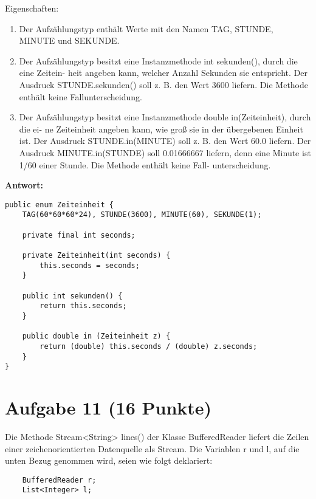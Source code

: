 Eigenschaften:

\begin{enumerate}
    \item Der Aufzählungstyp enthält Werte mit den Namen TAG, STUNDE, MINUTE und SEKUNDE.
    \item Der Aufzählungstyp besitzt eine Instanzmethode int sekunden(), durch die eine
          Zeitein- heit angeben kann, welcher Anzahl Sekunden sie entspricht. Der
          Ausdruck STUNDE.sekunden() soll z. B. den Wert 3600 liefern. Die Methode
          enthält keine Fallunterscheidung.
    \item Der Aufzählungstyp besitzt eine Instanzmethode double in(Zeiteinheit), durch
          die ei- ne Zeiteinheit angeben kann, wie groß sie in der übergebenen Einheit
          ist. Der Ausdruck STUNDE.in(MINUTE) soll z. B. den Wert 60.0 liefern. Der
          Ausdruck MINUTE.in(STUNDE) soll 0.01666667 liefern, denn eine Minute ist 1/60
          einer Stunde. Die Methode enthält keine Fall- unterscheidung.
\end{enumerate}

\textbf{Antwort:}

\begin{lstlisting}
public enum Zeiteinheit {
    TAG(60*60*60*24), STUNDE(3600), MINUTE(60), SEKUNDE(1);

    private final int seconds;
    
    private Zeiteinheit(int seconds) {
        this.seconds = seconds;
    }

    public int sekunden() {
        return this.seconds;
    }

    public double in (Zeiteinheit z) {
        return (double) this.seconds / (double) z.seconds;
    }
}
\end{lstlisting}

\section{Aufgabe 11 (16 Punkte)}
Die Methode Stream<String> lines() der Klasse BufferedReader liefert die Zeilen
einer zeichenorientierten Datenquelle als Stream. Die Variablen r und l, auf
die unten Bezug genommen wird, seien wie folgt deklariert:

\begin{lstlisting}
    BufferedReader r;
    List<Integer> l;
\end{lstlisting}

